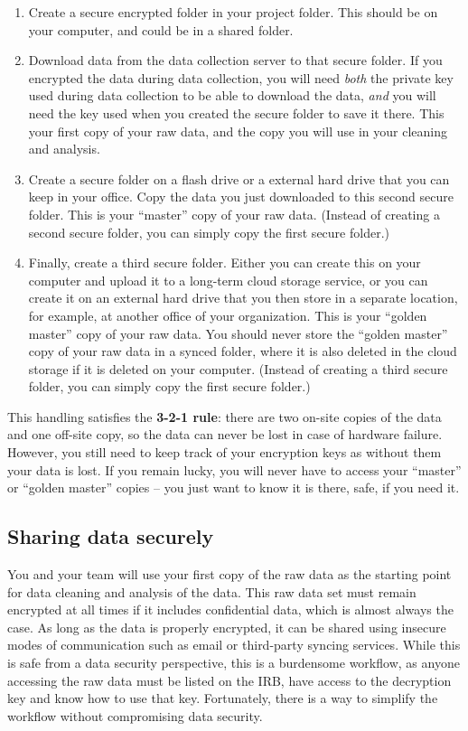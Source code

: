 \begin{enumerate}
	\item Create a secure encrypted folder in your project folder.
  This should be on your computer, and could be in a shared folder.
	\item Download data from the data collection server to that secure folder.
	If you encrypted the data during data collection, you will need \textit{both} the
	private key used during data collection to be able to download the data,
	\textit{and} you will need the key used when you created the secure folder to save it there.
	This your first copy of your raw data, and the copy you will use in your cleaning and analysis.
	\item Create a secure folder on a flash drive or a external hard drive that you can keep in your office.
	Copy the data you just downloaded to this second secure	folder.
	This is your ``master'' copy of your raw data.
	(Instead of creating a second secure folder, you can simply copy the first secure folder.)
	\item Finally, create a third secure folder.
	Either you can create this on your computer and upload it to a long-term cloud storage service,
	or you can create it on	an external hard drive that you then store in a separate location,
	for example, at another office of your organization.
	This is your ``golden master'' copy of your raw	data.
	You should never store the ``golden master'' copy of your raw data in a synced
	folder, where it is also deleted in the cloud storage if it is deleted on your computer.
	(Instead of creating a third secure folder, you can simply copy the first secure folder.)
\end{enumerate}

\noindent This handling satisfies the \textbf{3-2-1 rule}:
there are two on-site copies of the data and one off-site copy,
so the data can never be lost in case of hardware failure.
However, you still need to keep track of your encryption keys as without them your data is lost.
If you remain lucky, you will never have to access your ``master'' or ``golden master'' copies --
you just want to know it is there, safe, if you need it.

\subsection{Sharing data securely}
You and your team will use your first copy of the raw data
as the starting point for data cleaning and analysis of the data.
This raw data set must remain encrypted at all times if it includes confidential data,
which is almost always the case.
As long as the data is properly encrypted,
it can be shared using insecure modes of communication
such as email or third-party syncing services.
While this is safe from a data security perspective,
this is a burdensome workflow, as anyone accessing the raw data must be listed on the IRB,
have access to the decryption key and know how to use that key.
Fortunately, there is a way to simplify the workflow without compromising data security.

